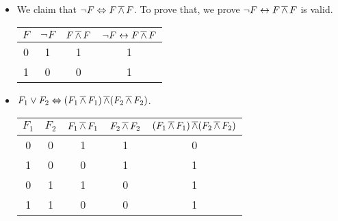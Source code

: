 \begin{exer}[1.4]
    $ $
    \begin{itemize}
        \item
            We claim that $\neg F \Leftrightarrow F \operatorname{\overline{\land}} F$.
            To prove that, we prove $\neg F \leftrightarrow F \operatorname{\overline{\land}} F$ is valid.
            \begin{center}
                \begin{tabular}{ |c|c|c||c| }
                    \hline
                    $F$ & $\neg F$ & $F \operatorname{\overline{\land}} F$ & $\neg F \leftrightarrow F \operatorname{\overline{\land}} F$\\
                    \hline
                    0 & 1 & 1 & 1 \\
                    \hline
                    1 & 0 & 0 & 1 \\
                    \hline
                \end{tabular}
            \end{center}
        \item
            $F_1 \lor F_2 \Leftrightarrow (F_1 \operatorname{\overline{\land}} F_1) \operatorname{\overline{\land}} (F_2 \operatorname{\overline{\land}} F_2)$.
            \begin{center}
                \begin{tabular}{ |c|c|c|c||c| }
                    \hline
                    $F_1$ & $F_2$ & $F_1 \operatorname{\overline{\land}} F_1$ & $F_2 \operatorname{\overline{\land}} F_2$ & $(F_1 \operatorname{\overline{\land}} F_1) \operatorname{\overline{\land}} (F_2 \operatorname{\overline{\land}} F_2)$\\
                    \hline
                    0 & 0 & 1 & 1 & 0 \\
                    \hline
                    1 & 0 & 0 & 1 & 1 \\
                    \hline
                    0 & 1 & 1 & 0 & 1 \\
                    \hline
                    1 & 1 & 0 & 0 & 1 \\
                    \hline
                \end{tabular}
            \end{center}
    \end{itemize}
\end{exer}

